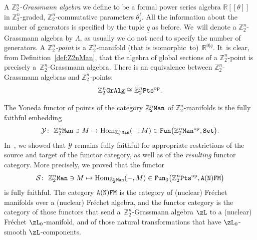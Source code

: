 \documentclass[10pt,a4paper]{amsart}
\newcommand{\op}[1]{\operatorname{#1}}
\newcommand{\catname}[1]{\textnormal{\texttt{#1}}}
\newcommand{\R}{{\mathbb R}}
\newcommand{\Z}{{\mathbb Z}}
\def\ul{\underline}
\def\ul{\underline}
\newcommand{\0}{\otimes}
\newcommand{\z}{\Z_2^n}
\numberwithin{equation}{section}
\begin{document}
A \emph{$\Z_2^n$-Grassmann algebra} we define to be a formal power series algebra $\R[[\theta]]$ in $\Z_2^n$-graded, $\Z_2^n$-commutative parameters $\theta_j^\ell$. All the information about the number of generators is specified by the tuple $\ul{q}$ as before. We~will denote a $\Z_2^n$-Grassmann algebra by $\Lambda$, as usually we do not need to specify the number of generators. A \emph{$\Z_2^n$-point} is a $\Z_2^n$-manifold (that is isomor\-phic~to)~$\R^{0|\ul q}$. It~is clear, from Definition~\ref{def:Z2nMan}, that the algebra of global sections of a $\Z_2^n$-point is precisely a~$\Z_2^n$-Grassmann algebra. There is an equivalence between $\Z^n_2$-Grassmann algebras and $\Z_2^n$-points:
\[
\Z_2^n\catname{GrAlg} \cong \Z_2^n\catname{Pts}^\textnormal{op}.
\]

The Yoneda functor of points of the category $\z\tt Man$ of $\z$-manifolds is the fully faithful embedding
\[
\mathcal{Y}\colon\ \z{\tt Man}\ni M\mapsto \op{Hom}_{\z{\tt Man}}(-,M)\in{\tt Fun}\big(\z{\tt Man}^{\op{op}},{\tt Set}\big).
\]
In~\cite{Bruce:2019b}, we showed that $\mathcal Y$ remains fully faithful for appropriate restrictions of the source and target of the functor category, as well as of the {\it resulting} functor category. More precisely, we proved that the functor
\[
\mathcal{S}\colon\ \z{\tt Man}\ni M\mapsto \op{Hom}_{\z{\tt Man}}(-,M)\in{\tt Fun}_0\big(\z{\tt Pts}^{\op{op}},\tt A(N)FM\big)
\]
is fully faithful. The category $\tt A(N)FM$ is the category of (nuclear) Fr\'echet manifolds over a (nuc\-lear) Fr\'echet algebra, and the functor category is the category of those functors that send a~$\z$-Grassmann algebra $\zL$ to a (nuclear) Fr\'echet $\zL_0$-manifold, and of those natural transformations that have $\zL_0$-smooth $\zL$-components.

\end{document}
